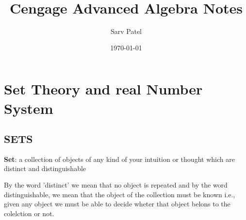 \documentclass[twocolumn,12pt]{book}
\title{Cengage Advanced Algebra Notes}
\author{Sarv Patel}
\date{\today}
\theoremstyle{definition}
\theoremstyle{remark}
\begin{document}
\chapter{Set Theory and real Number System}
\section{SETS}
\textbf{Set}: a collection of objects of any kind of your intuition or thought which are distinct and distinguishable

\indent By the word 'distinct' we mean that no object is repeated and by the word distinguishable, we mean that the object of the collection must be known i.e., given any object we must be able to decide wheter that object belons to the colelction or not.

\end{document}
